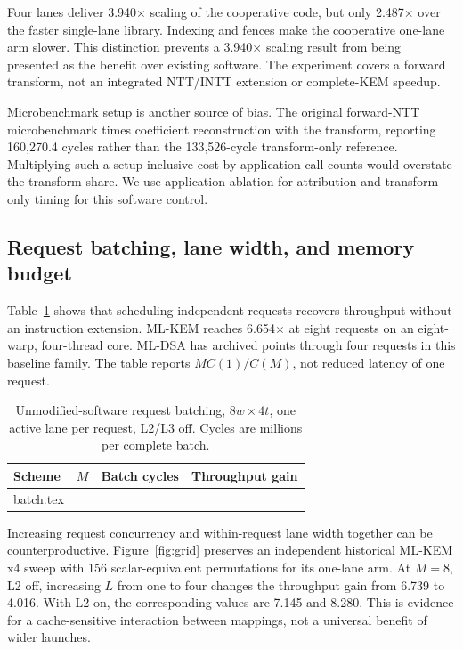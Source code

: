 \documentclass[conference,letterpaper]{IEEEtran}
\makeatletter
\newcommand{\tablerows}[1]{\@@input #1 }
\newcommand{\src}[1]{\par\smallskip{\scriptsize Source: \nolinkurl{#1}.}}
\makeatother
\begin{document}
Four lanes deliver 3.940$\times$ scaling of the cooperative code, but only
2.487$\times$ over the faster single-lane library. Indexing and fences
make the cooperative one-lane arm slower. This distinction prevents a
3.940$\times$ scaling result from being presented as the benefit over
existing software. The experiment covers a forward transform, not an
integrated NTT/INTT extension or complete-KEM speedup.

Microbenchmark setup is another source of bias. The original forward-NTT
microbenchmark times coefficient reconstruction with the transform, reporting
160,270.4 cycles rather than the 133,526-cycle transform-only reference.
Multiplying such a setup-inclusive cost by application call counts would
overstate the transform share. We use application ablation for attribution
and transform-only timing for this software control.

\subsection{Request batching, lane width, and memory budget}
Table~\ref{tab:batch} shows that scheduling independent requests recovers
throughput without an instruction extension. ML-KEM reaches
6.654$\times$ at eight requests on an eight-warp, four-thread core.
ML-DSA has archived points through four requests in this baseline family.
The table reports $M C(1)/C(M)$, not reduced latency of one request.

\begin{table}[t]
\caption{Unmodified-software request batching, $8w\times4t$, one active
lane per request, L2/L3 off. Cycles are millions per complete batch.}
\label{tab:batch}
\centering\footnotesize
\begin{tabular}{@{}lrrr@{}}
\toprule
Scheme & $M$ & Batch cycles & Throughput gain \\
\midrule
\tablerows{batch.tex}
\bottomrule
\end{tabular}
\src{pqc/results/batch_baseline.csv}
\end{table}

Increasing request concurrency and within-request lane width together can
be counterproductive. Figure~\ref{fig:grid} preserves an independent
historical ML-KEM x4 sweep with 156 scalar-equivalent permutations for its
one-lane arm. At $M=8$, L2 off, increasing $L$ from one to four changes the
throughput gain from 6.739 to 4.016. With L2 on, the corresponding values
are 7.145 and 8.280. This is evidence for a cache-sensitive interaction
between mappings, not a universal benefit of wider launches.
\end{document}
